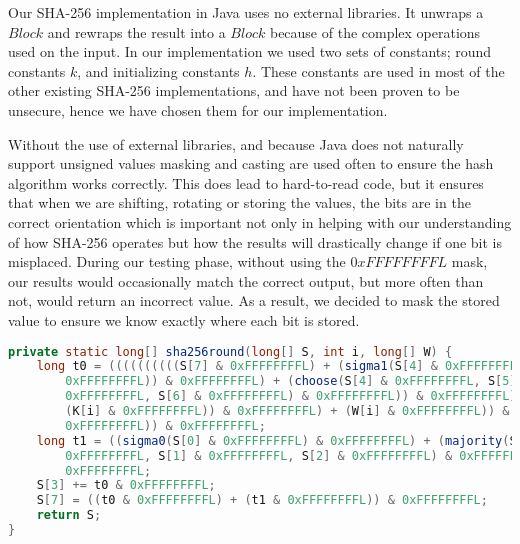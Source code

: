 Our SHA-256 implementation in Java uses no external libraries. It unwraps a $Block$ and rewraps the result into a $Block$ because of the complex operations used on the input.
In our implementation we used two sets of constants; round constants $k$, and initializing constants $h$.
These constants are used in most of the other existing SHA-256 implementations, and have not been proven to be unsecure, hence we have chosen them for our implementation.

Without the use of external libraries, and because Java does not naturally support unsigned values masking and casting are used often to ensure the hash algorithm works correctly. This does lead to hard-to-read code, but it ensures that when we are shifting, rotating or storing the values, the bits are in the correct orientation which is important not only in helping with our understanding of how SHA-256 operates but how the results will drastically change if one bit is misplaced. During our testing phase, without using the $0xFFFFFFFFL$ mask, our results would occasionally match the correct output, but more often than not, would return an incorrect value. As a result, we decided to mask the stored value to ensure we know exactly where each bit is stored.
\begin{lstlisting}[language=Java]
private static long[] sha256round(long[] S, int i, long[] W) {
    long t0 = ((((((((((S[7] & 0xFFFFFFFFL) + (sigma1(S[4] & 0xFFFFFFFFL) 
        0xFFFFFFFFL)) & 0xFFFFFFFFL) + (choose(S[4] & 0xFFFFFFFFL, S[5] & 
        0xFFFFFFFFL, S[6] & 0xFFFFFFFFL) & 0xFFFFFFFFL)) & 0xFFFFFFFFL) + 
        (K[i] & 0xFFFFFFFFL)) & 0xFFFFFFFFL) + (W[i] & 0xFFFFFFFFL)) & 
        0xFFFFFFFFL)) & 0xFFFFFFFFL;
    long t1 = ((sigma0(S[0] & 0xFFFFFFFFL) & 0xFFFFFFFFL) + (majority(S[0] & 
        0xFFFFFFFFL, S[1] & 0xFFFFFFFFL, S[2] & 0xFFFFFFFFL) & 0xFFFFFFFFL)) & 
        0xFFFFFFFFL;
    S[3] += t0 & 0xFFFFFFFFL;
    S[7] = ((t0 & 0xFFFFFFFFL) + (t1 & 0xFFFFFFFFL)) & 0xFFFFFFFFL;
    return S;
}
\end{lstlisting}